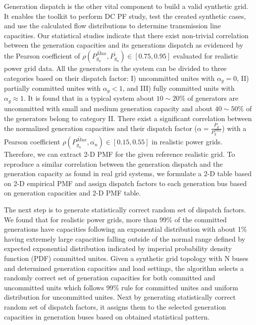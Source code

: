 \documentclass[12pt]{article}
\numberwithin{equation}{section}
\numberwithin{table}{section}
\numberwithin{figure}{section}
\begin{document}
Generation dispatch is the other vital component to build a valid synthetic grid. It enables the toolkit to perform DC PF study, test the created synthetic cases, and use the calculated flow distributions to determine transmission line capacities. Our statistical studies indicate that there exist non-trivial correlation between the generation capacities and its generations dispatch as evidenced by the Pearson coefficient of $\rho(\overline{P^{Max}_{g_n}} , \overline{P_{g_n}}) \in [0.75, 0.95]$ evaluated for realistic power grid data. All the generators in the system can be divided to three categories based on their dispatch factor: I) uncommitted unites with $\alpha_g=0$, II) partially committed unites with $\alpha_g < 1$, and III) fully committed units with $\alpha_g \approx 1$. It is found that in a typical system about $10 \sim 20\%$ of generators are uncommitted with small and medium generation capacity and about $40 \sim 50\%$ of the generators belong to category II. There exist a significant correlation between the normalized generation capacities and their dispatch factor ($\alpha=\frac{P_g}{P_g^{max}}$) with a Pearson coefficient $\rho(\overline{P^{Max}_{g_n}} , \overline{\alpha_n}) \in [0.15, 0.55]$ in realistic power grids. Therefore, we can extract 2-D PMF for the given reference realistic grid. To reproduce a similar correlation between the generation dispatch and the generation capacity as found in real grid systems, we formulate a 2-D table based on 2-D empirical PMF and assign dispatch factors to each generation bus based on generation capacities and 2-D PMF table.

The next step is to generate statistically correct random set of dispatch factors. We found that for realistic power grids, more than 99\% of the committed generations have capacities following an exponential distribution with about 1\% having extremely large capacities falling outside of the normal range defined by expected exponential distribution indicated by imperial probability density function (PDF) committed unites.
Given a synthetic grid topology with N buses and determined generation capacities and load settings, the algorithm selects a randomly correct set of generation capacities for both committed and uncommitted units which follows 99\% rule for committed unites and uniform distribution for uncommitted unites. Next by generating statistically correct random set of dispatch factors, it assigns them to the selected generation capacities in generation buses based on obtained statistical pattern.
\end{document}
